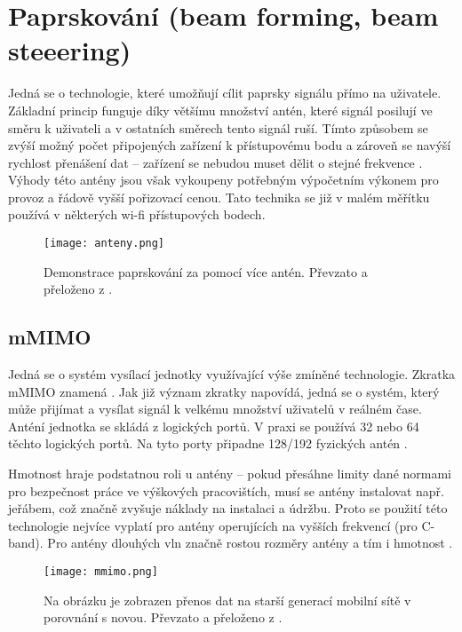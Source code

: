 \section{Paprskování (beam forming, beam steeering) }
Jedná se o technologie, které umožňují cílit paprsky signálu přímo na uživatele. Základní princip funguje díky většímu množství antén, které signál posilují ve směru k uživateli a v ostatních směrech tento signál ruší. Tímto způsobem se zvýší možný počet připojených zařízení k přístupovému bodu a zároveň se navýší rychlost přenášení dat -- zařízení se nebudou muset dělit o stejné frekvence \cite{BeamForming}. Výhody této antény jsou však vykoupeny potřebným výpočetním výkonem pro provoz  a řádově vyšší pořizovací cenou. Tato technika se již v malém měřítku používá v některých wi-fi přístupových bodech. 
\begin{figure}[h]
\centering
   \texttt{[image: anteny.png]}
    \caption{Demonstrace paprskování za pomocí více antén. Převzato a přeloženo z \cite{BeamFormingObr}.}
    \label{fig:anteny1}
\end{figure}
\par 
\subsection{mMIMO}
Jedná se o systém vysílací jednotky využívající výše zmíněné technologie. Zkratka mMIMO znamená . Jak již význam zkratky napovídá, jedná se o systém, který může přijímat a vysílat signál k velkému množství uživatelů v reálném čase. Anténí jednotka se skládá z logických portů. V praxi se používá 32 nebo 64 těchto logických portů. Na tyto porty připadne 128/192 fyzických antén \cite{BeamForming}.
\par
Hmotnost hraje podstatnou roli u antény -- pokud přesáhne limity dané normami pro bezpečnost práce ve výškových pracovištích, musí se antény instalovat např. jeřábem, což značně zvyšuje náklady na instalaci a údržbu. Proto se použití této technologie nejvíce vyplatí  pro antény operujících na  vyšších frekvencí (pro C-band). Pro antény dlouhých vln značně rostou rozměry antény a tím i hmotnost \cite{Cetin}.  

\begin{figure}[ht]
\centering
   \texttt{[image: mmimo.png]}
    \caption{Na obrázku je zobrazen přenos dat na starší generací mobilní sítě v porovnání s novou. Převzato a přeloženo z \cite{mmimoObr}.}
    \label{fig:anteny2}
\end{figure}
